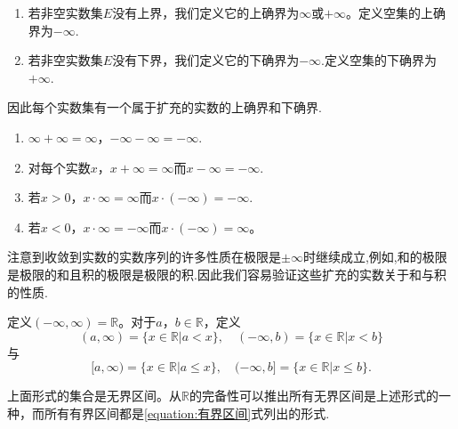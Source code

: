 \documentclass[lang=cn,newtx,10pt,scheme=chinese]{elegantbook}
\begin{document}
\begin{definition}[扩充的实数的上下确界]\label{definition:扩充的实数的上下确界}
\begin{enumerate}
  \item 若非空实数集\(E\)没有上界，我们定义它的上确界为\(\infty\)或$+\infty$。定义空集的上确界为\(-\infty\).
  \item 若非空实数集\(E\)没有下界，我们定义它的下确界为$-\infty$.定义空集的下确界为\(+\infty\).
\end{enumerate}
\end{definition}
\begin{note}
  因此每个实数集有一个属于扩充的实数的上确界和下确界.
\end{note}

\begin{proposition}[扩充的实数关于和与积的性质]\label{proposition:扩充的实数关于和与积的性质}
\begin{enumerate}
  \item \(\infty+\infty=\infty\)，\(-\infty - \infty=-\infty\).
  \item 对每个实数\(x\)，\(x+\infty=\infty\)而\(x - \infty=-\infty\).
  \item 若\(x>0\)，\(x\cdot\infty=\infty\)而\(x\cdot(-\infty)=-\infty\).
  \item 若\(x<0\)，\(x\cdot\infty=-\infty\)而\(x\cdot(-\infty)=\infty\)。
\end{enumerate}
\end{proposition}
\begin{remark}
  注意到收敛到实数的实数序列的许多性质在极限是\(\pm\infty\)时继续成立,例如,和的极限是极限的和且积的极限是极限的积.因此我们容易验证这些扩充的实数关于和与积的性质.
\end{remark}

\begin{definition}[无界区间]\label{definition:无界区间}
  定义\((-\infty,\infty)=\mathbb{R}\)。对于\(a\)，\(b\in\mathbb{R}\)，定义
\[
(a,\infty)=\{x\in\mathbb{R}|a < x\},\quad (-\infty,b)=\{x\in\mathbb{R}|x < b\}
\]
与
\[
[a,\infty)=\{x\in\mathbb{R}|a\leqslant x\},\quad (-\infty,b]=\{x\in\mathbb{R}|x\leqslant b\}.
\]
\end{definition}
\begin{note}
  上面形式的集合是无界区间。从\(\mathbb{R}\)的完备性可以推出所有无界区间是上述形式的一种，而所有有界区间都是\eqref{equation:有界区间}式列出的形式.
\end{note}
\end{document}
